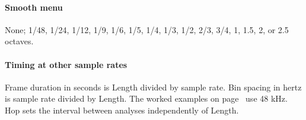 \paragraph{Smooth menu}
None; 1/48, 1/24, 1/12, 1/9, 1/6, 1/5, 1/4, 1/3, 1/2, 2/3, 3/4, 1,
1.5, 2, or 2.5 octaves.

\paragraph{Timing at other sample rates}
Frame duration in seconds is Length divided by sample rate. Bin spacing
in hertz is sample rate divided by Length. The worked examples on
page~\pageref{sec:resolution} use 48 kHz. Hop sets the interval between
analyses independently of Length.
